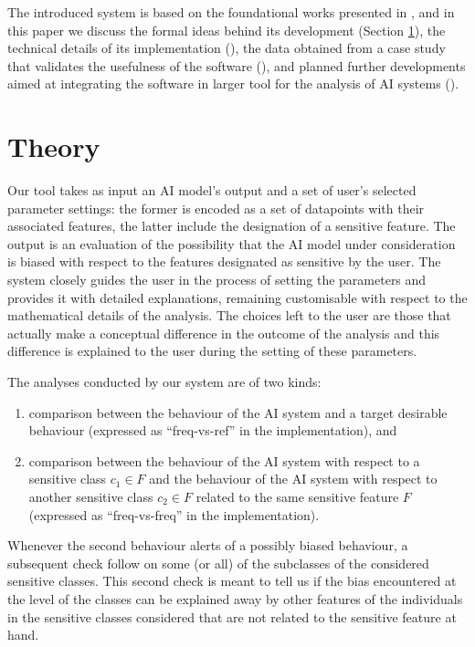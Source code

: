 \documentclass[
]{ceurart}
\begin{document}
The introduced system is based on the foundational works presented in \cite{dap21,dagp22,gp23}, and in this paper we discuss the formal ideas behind its development (Section \ref{sec:theory}), the technical details of its implementation  (), the data obtained from a case study that validates the usefulness of the software (), and planned further developments aimed at integrating the software in larger tool for the analysis of AI systems ().

\section{Theory}\label{sec:theory}

Our tool takes as input an AI model's output and a set of user's selected parameter settings: the former is encoded as a set of datapoints with their associated features, the latter include the designation of a sensitive feature. The output is an evaluation of the possibility that the AI model under consideration is biased with respect to the features designated as sensitive by the user. The system closely guides the user in the process of setting the parameters and provides it with detailed explanations, remaining customisable with respect to the mathematical details of the analysis. The choices left to the user are those that actually make a conceptual difference in the outcome of the analysis and this difference is explained to the user during the setting of these parameters.

The analyses conducted by our system are of two kinds: 

\begin{enumerate}
	\item comparison between the behaviour of the AI system and a target desirable behaviour (expressed as ``freq-vs-ref'' in the implementation), and
	
	\item comparison between the behaviour of the AI system with respect to a sensitive class $c_1\in F$ and the behaviour of the AI system with respect to another sensitive class $c_2\in F$ related to the same sensitive feature $F$ (expressed as ``freq-vs-freq'' in the implementation).
\end{enumerate}

Whenever the second behaviour alerts of a possibly biased behaviour, a subsequent check follow on some (or all) of the subclasses of the considered sensitive classes. This second check is meant to tell us if the bias encountered at the level of the classes can be explained away by other features of the individuals in the sensitive classes considered that are not related to the sensitive feature at hand.
\end{document}
